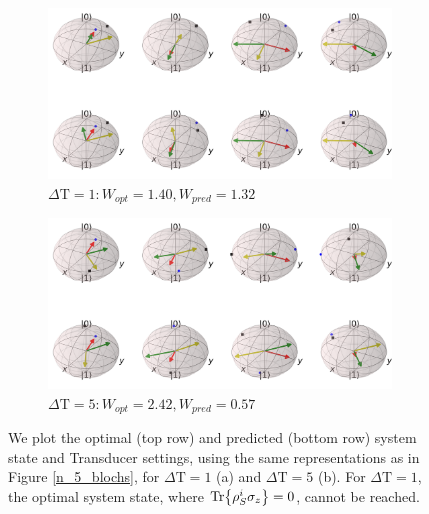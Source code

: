 \begin{figure}
	\centering
	\begin{subfigure}{0.85\textwidth}
		\centering
		\includegraphics[width=\textwidth]{img/bloch_comp_1_crop}
		\caption{$\Delta \mathrm{T} = 1: W_{opt} = 1.40, W_{pred} = 1.32$}
		\label{}
	\end{subfigure}
	\begin{subfigure}{0.85\textwidth}
		\centering
		\includegraphics[width=\textwidth]{img/bloch_comp_5_crop}
		\caption{$\Delta \mathrm{T} = 5: W_{opt} = 2.42, W_{pred} = 0.57$}
		\label{}
	\end{subfigure}
	\caption{We plot the optimal (top row) and predicted (bottom row) system state and Transducer settings, using the same representations as in Figure \ref{n_5_blochs}, for $\Delta \mathrm{T} = 1$ (a) and $\Delta \mathrm{T} = 5$ (b). For $\Delta \mathrm{T} = 1$, the optimal system state, where $\Tr{\rho_S^i \sigma_z} = 0$, cannot be reached.}
	\label{}
\end{figure}